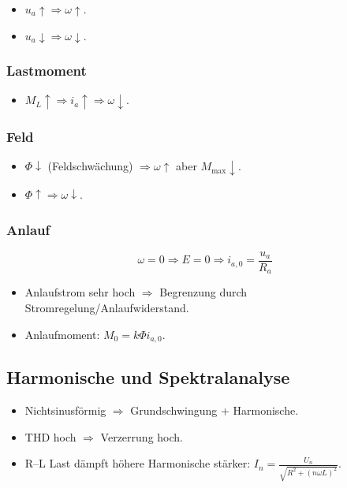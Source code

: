 \begin{itemize}
\item $u_a\uparrow \Rightarrow \omega\uparrow$.
\item $u_a\downarrow \Rightarrow \omega\downarrow$.
\end{itemize}

\subsubsection{Lastmoment}

\begin{itemize}
\item $M_L\uparrow \Rightarrow i_a\uparrow \Rightarrow \omega\downarrow$.
\end{itemize}

\subsubsection{Feld}

\begin{itemize}
\item $\Phi\downarrow$ (Feldschwächung) $\Rightarrow \omega\uparrow$ aber $M_{\max}\downarrow$.
\item $\Phi\uparrow \Rightarrow \omega\downarrow$.
\end{itemize}

\subsubsection{Anlauf}

\[
\omega=0 \Rightarrow E=0 \Rightarrow i_{a,0}=\frac{u_a}{R_a}
\]

\begin{itemize}
\item Anlaufstrom sehr hoch $\Rightarrow$ Begrenzung durch Stromregelung/Anlaufwiderstand.
\item Anlaufmoment: $M_0=k\Phi i_{a,0}$.
\end{itemize}

\subsection{Harmonische und Spektralanalyse}

\begin{itemize}
\item Nichtsinusförmig $\Rightarrow$ Grundschwingung + Harmonische.
\item THD hoch $\Rightarrow$ Verzerrung hoch.
\item R--L Last dämpft höhere Harmonische stärker: $I_n=\frac{U_n}{\sqrt{R^2+(n\omega L)^2}}$.
\end{itemize}

